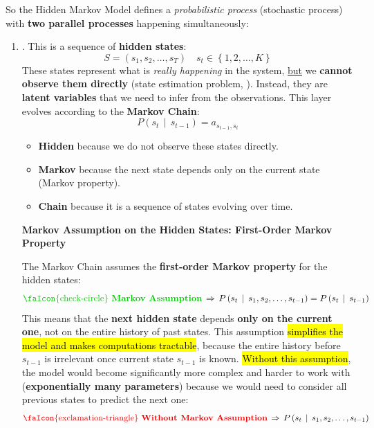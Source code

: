 \noindent
So the Hidden Markov Model defines a \emph{probabilistic process} (stochastic process) with \textbf{two parallel processes} happening simultaneously:
\begin{enumerate}
    \item {}. This is a sequence of \textbf{hidden states}:
    \begin{equation*}
        S = \left(s_1, s_2, \ldots, s_T\right) \quad s_t \in \left\{1, 2, \ldots, K\right\}
    \end{equation*}
    These states represent what is \emph{really happening} in the system, \underline{but} we \textbf{cannot observe them directly} (state estimation problem, ). Instead, they are \textbf{latent variables} that we need to infer from the observations. This layer evolves according to the \textbf{Markov Chain}:
    \begin{equation*}
        P\left(s_t \, \mid \, s_{t-1}\right) = a_{s_{t-1}, s_t}
    \end{equation*}
    \begin{itemize}
        \item \textbf{Hidden} because we do not observe these states directly.
        \item \textbf{Markov} because the next state depends only on the current state (Markov property).
        \item \textbf{Chain} because it is a sequence of states evolving over time.
    \end{itemize}

    \begin{flushleft}
        \textcolor{DarkOrange3}{ \textbf{Markov Assumption on the Hidden States: First-Order Markov Property}}
    \end{flushleft}
    The Markov Chain assumes the \textbf{first-order Markov property} for the hidden states:
    \begin{equation*}
        \textcolor{Green3}{\text{\faIcon{check-circle} } \textbf{Markov Assumption}} \, \Rightarrow \, P\left(s_t \, \mid \, s_{1}, s_{2}, \ldots, s_{t-1}\right) = P\left(s_t \, \mid \, s_{t-1}\right)
    \end{equation*}
    This means that the \textbf{next hidden state} depends \textbf{only on the current one}, not on the entire history of past states. This assumption \hl{simplifies the model and makes computations tractable}, because the entire history before $s_{t-1}$ is irrelevant once current state $s_{t-1}$ is known. \hl{Without this assumption}, the model would become significantly more complex and harder to work with (\textbf{exponentially many parameters}) because we would need to consider all previous states to predict the next one:
    \begin{equation*}
        \textcolor{Red2}{\text{\faIcon{exclamation-triangle} } \textbf{Without Markov Assumption}} \, \Rightarrow \, P\left(s_t \, \mid \, s_{1}, s_{2}, \ldots, s_{t-1}\right)
    \end{equation*}
    


\end{enumerate}
